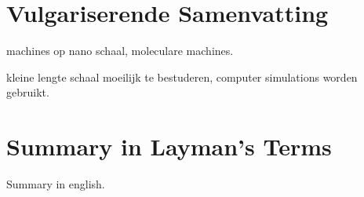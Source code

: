\chapter*{Vulgariserende Samenvatting}

machines op nano schaal, moleculare machines.

kleine lengte schaal moeilijk te bestuderen, computer simulations worden gebruikt.

\cleardoublepage
{}
\chapter*{Summary in Layman's Terms}
Summary in english.
